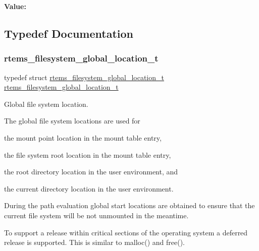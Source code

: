 {\bfseries Value\+:}
\begin{DoxyCode}{0}
\DoxyCodeLine{\textcolor{keywordflow}{do} \{ \(\backslash\)}

\end{DoxyCode}


\subsection{Typedef Documentation}
\mbox{\label{group__LibIO_ga69a213a91be2c0d1c6ecda8b49f26e0b}} 
\subsubsection{\texorpdfstring{rtems\_filesystem\_global\_location\_t}{rtems\_filesystem\_global\_location\_t}}
{\footnotesize\ttfamily typedef struct \mbox{\hyperlink{structrtems__filesystem__global__location__t}{rtems\+\_\+filesystem\+\_\+global\+\_\+location\+\_\+t}}  \mbox{\hyperlink{structrtems__filesystem__global__location__t}{rtems\+\_\+filesystem\+\_\+global\+\_\+location\+\_\+t}}}



Global file system location. 

The global file system locations are used for
\begin{DoxyItemize}
\item the mount point location in the mount table entry,
\item the file system root location in the mount table entry,
\item the root directory location in the user environment, and
\item the current directory location in the user environment.
\end{DoxyItemize}

During the path evaluation global start locations are obtained to ensure that the current file system will be not unmounted in the meantime.

To support a release within critical sections of the operating system a deferred release is supported. This is similar to malloc() and free().

